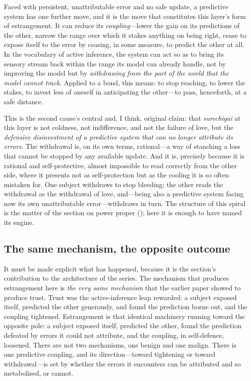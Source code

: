 Faced with persistent, unattributable error and no safe update, a predictive system has one further move, and it is the move that constitutes this layer's form of estrangement. It can reduce its \emph{coupling}---lower the gain on its predictions of the other, narrow the range over which it stakes anything on being right, cease to expose itself to the error by ceasing, in some measure, to predict the other at all. In the vocabulary of active inference, the system can act so as to bring its sensory stream back within the range its model can already handle, not by improving the model but by \emph{withdrawing from the part of the world that the model cannot track}. Applied to a bond, this means: to stop reaching, to lower the stakes, to invest less of oneself in anticipating the other---to pass, henceforth, at a safe distance.

This is the second cause's central and, I think, original claim: that \emph{surechigai} at this layer is not coldness, not indifference, and not the failure of love, but the \emph{defensive disinvestment of a predictive system that can no longer attribute its errors}. The withdrawal is, on its own terms, rational---a way of stanching a loss that cannot be stopped by any available update. And it is, precisely because it is rational and self-protective, almost impossible to read correctly from the other side, where it presents not as self-protection but as the cooling it is so often mistaken for. One subject withdraws to stop bleeding; the other reads the withdrawal as the withdrawal of love, and---being also a predictive system facing now its own unattributable error---withdraws in turn. The structure of this spiral is the matter of the section on power proper (); here it is enough to have named its engine.

\subsection{The same mechanism, the opposite outcome}
\label{p17:sub:prediction-symmetry}

It must be made explicit what has happened, because it is the section's contribution to the architecture of the series. The mechanism that produces estrangement here is \emph{the very same mechanism} that the earlier paper showed to produce trust. Trust was the active-inference leap rewarded: a subject exposed itself, predicted the other generously, and found the prediction borne out, and the coupling tightened. Estrangement is that identical machinery running toward the opposite pole: a subject exposed itself, predicted the other, found the prediction defeated by errors it could not attribute, and the coupling, in self-defence, loosened. There are not two mechanisms, one benign and one malign. There is one predictive coupling, and its direction---toward tightening or toward withdrawal---is set by whether the errors it encounters can be attributed and so metabolised, or cannot.


